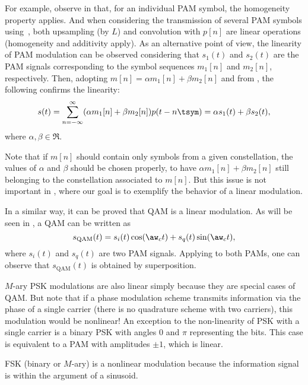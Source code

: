 For example, observe in  that, for an individual PAM symbol, the homogeneity property applies. 
And when considering the transmission of several PAM symbols using~, both upsampling (by $L$) and convolution with $p[n]$ are linear operations (homogeneity and additivity apply).
As an alternative point of view,  the linearity of PAM modulation can be observed considering that $s_1(t)$ and $s_2(t)$ are the PAM signals corresponding to the symbol sequences $m_1[n]$ and $m_2[n]$, respectively. Then, adopting $m[n]=\alpha m_1[n]+ \beta m_2[n]$ and from , the following confirms the linearity:
\begin{equation}
s(t) = \sum_{n=-\infty}^{\infty} (\alpha m_1[n] + \beta m_2[n]) p(t-n \tsym) = \alpha s_1(t) + \beta s_2(t),
\label{eq:pam_linearity}
\end{equation}
where $\alpha, \beta \in \Re$. 

Note that if $m[n]$ should contain only symbols from a given constellation, the values of $\alpha$ and $\beta$ should be chosen properly, to have $\alpha m_1[n] + \beta m_2[n]$ still belonging to the constellation associated to $m[n]$. But this issue is not important in , where our goal is to exemplify the behavior of a linear modulation.

In a similar way, it can be proved that QAM is a linear modulation. As will be seen in , a QAM can be written as
\[
s_{\textrm{QAM}}(t) = s_i(t) \cos(\aw_c t) + s_q(t) \sin(\aw_c t),
\]
where $s_i(t)$ and $s_q(t)$ are two PAM signals. Applying  to both PAMs, one can observe that $s_{\textrm{QAM}}(t)$ is obtained by superposition. 

$M$-ary PSK modulations are also linear simply because they are special cases of QAM. But note that if a phase modulation scheme transmits information via the phase of a single carrier (there is no quadrature scheme with two carriers), this modulation would be nonlinear! An exception to the non-linearity of PSK with a single carrier is a binary PSK with angles 0 and $\pi$ representing the bits. This case is equivalent to a PAM with amplitudes $\pm 1$, which is linear.

FSK (binary or $M$-ary) is a nonlinear modulation because the information signal is within the argument of a sinusoid. 

